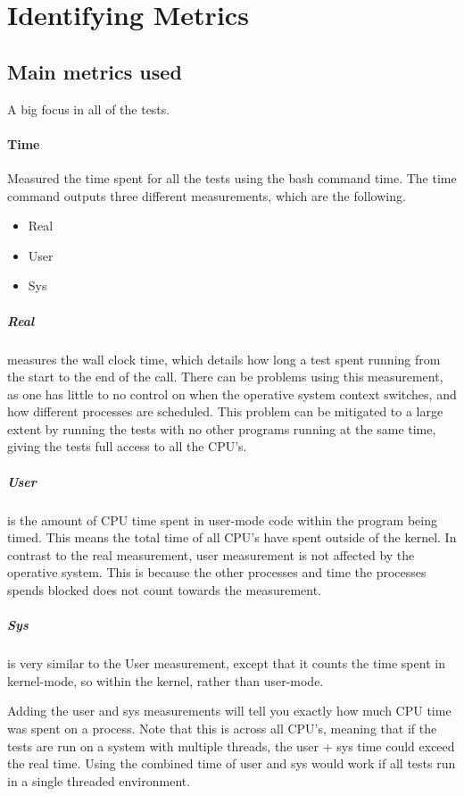 \section{Identifying Metrics}

\subsection{Main metrics used}
A big focus in all of the tests.


\paragraph{Time}
Measured the time spent for all the tests using the bash command time.
The time command outputs three different measurements, which are the following.

\begin{itemize}
    \item Real
    \item User
    \item Sys
\end{itemize}

\subparagraph{Real}measures the wall clock time, which details how long a test spent running from the start to the end of the call.
There can be problems using this measurement, as one has little to no control on when the operative system context switches, and how different processes are scheduled.
This problem can be mitigated to a large extent by running the tests with no other programs running at the same time, giving the tests full access to all the CPU's.

\subparagraph{User}is the amount of CPU time spent in user-mode code within the program being timed.
This means the total time of all CPU's have spent outside of the kernel.
In contrast to the real measurement, user measurement is not affected by the operative system.
This is because the other processes and time the processes spends blocked does not count towards the measurement.

\subparagraph{Sys}is very similar to the User measurement, except that it counts the time spent in kernel-mode, so within the kernel, rather than user-mode.

Adding the user and sys measurements will tell you exactly how much CPU time was spent on a process.
Note that this is across all CPU's, meaning that if the tests are run on a system with multiple threads, the user + sys time could exceed the real time.
Using the combined time of user and sys would work if all tests run in a single threaded environment.


